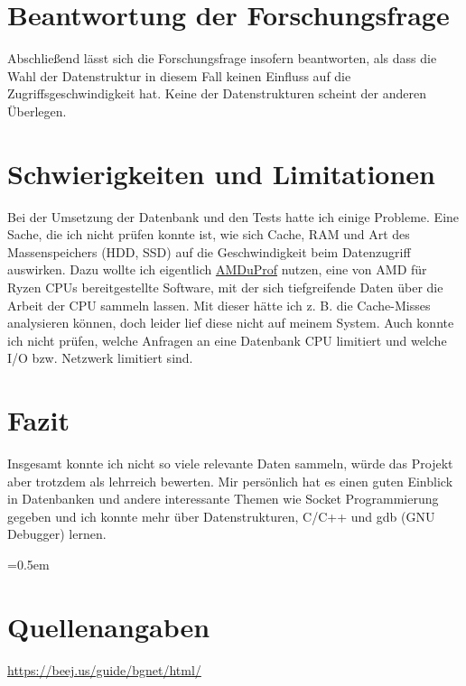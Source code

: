 \documentclass[11pt,a4paper]{article}
\begin{document}
\section{Beantwortung der Forschungsfrage}

Abschließend lässt sich die Forschungsfrage insofern beantworten, als dass
die Wahl der Datenstruktur in diesem Fall keinen Einfluss auf die Zugriffsgeschwindigkeit
hat. Keine der Datenstrukturen scheint der anderen Überlegen.

\section{Schwierigkeiten und Limitationen}

Bei der Umsetzung der Datenbank und den Tests hatte ich einige Probleme.
Eine Sache, die ich nicht prüfen konnte ist, wie sich Cache, RAM und Art des
Massenspeichers (HDD, SSD) auf die Geschwindigkeit beim Datenzugriff auswirken.
Dazu wollte ich eigentlich \href{https://www.amd.com/en/developer/uprof.html}{AMDuProf}
nutzen, eine von AMD für Ryzen CPUs bereitgestellte Software, mit der sich tiefgreifende
Daten über die Arbeit der CPU sammeln lassen. Mit dieser hätte ich z. B. die Cache-Misses
analysieren können, doch leider lief diese nicht auf meinem System.
Auch konnte ich nicht prüfen, welche Anfragen an eine Datenbank CPU limitiert
und welche I/O bzw. Netzwerk limitiert sind.

\section{Fazit}

Insgesamt konnte ich nicht so viele relevante Daten sammeln, würde das Projekt aber
trotzdem als lehrreich bewerten. Mir persönlich hat es einen guten Einblick in
Datenbanken und andere interessante Themen wie Socket Programmierung gegeben
und ich konnte mehr über Datenstrukturen, C/C++ und gdb (GNU Debugger) lernen.

\clearpage

\emergencystretch=0.5em

\section{Quellenangaben}

\url{https://beej.us/guide/bgnet/html/}

\printbibliography[title={Literaturverzeichnis}]
\end{document}

